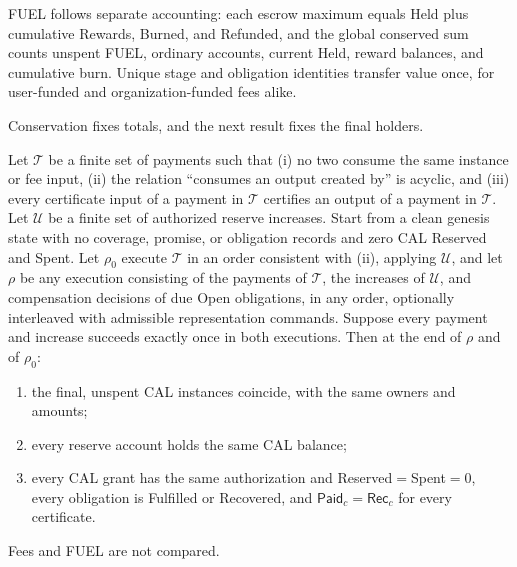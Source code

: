 FUEL follows separate accounting: each escrow maximum equals Held plus cumulative Rewards, Burned, and Refunded, and the global conserved sum counts unspent FUEL, ordinary accounts, current Held, reward balances, and cumulative burn. Unique stage and obligation identities transfer value once, for user-funded and organization-funded fees alike.

Conservation fixes totals, and the next result fixes the final holders.

\begin{theorem}
\label{thm:security-neutrality}
Let $\mathcal T$ be a finite set of payments such that (i) no two consume
the same instance or fee input, (ii) the relation ``consumes an output
created by'' is acyclic, and (iii) every certificate input of a payment in
$\mathcal T$ certifies an output of a payment in $\mathcal T$. Let
$\mathcal U$ be a finite set of authorized reserve increases. Start from a
clean genesis state with no coverage, promise, or obligation records and
zero CAL Reserved and Spent. Let $\rho_0$ execute $\mathcal T$ in an order
consistent with (ii), applying $\mathcal U$, and let $\rho$ be any
execution consisting of the payments of $\mathcal T$, the increases of
$\mathcal U$, and compensation decisions of due Open obligations, in any
order, optionally interleaved with admissible representation commands.
Suppose every payment and increase succeeds exactly once in both
executions. Then at the end of $\rho$ and of $\rho_0$:
\begin{enumerate}
\item the final, unspent CAL instances coincide, with the same owners and
amounts;
\item every reserve account holds the same CAL balance;
\item every CAL grant has the same authorization and
Reserved$=$Spent$=0$, every obligation is Fulfilled or Recovered, and
$\mathsf{Paid}_c=\mathsf{Rec}_c$ for every certificate.
\end{enumerate}
Fees and FUEL are not compared.
\end{theorem}
